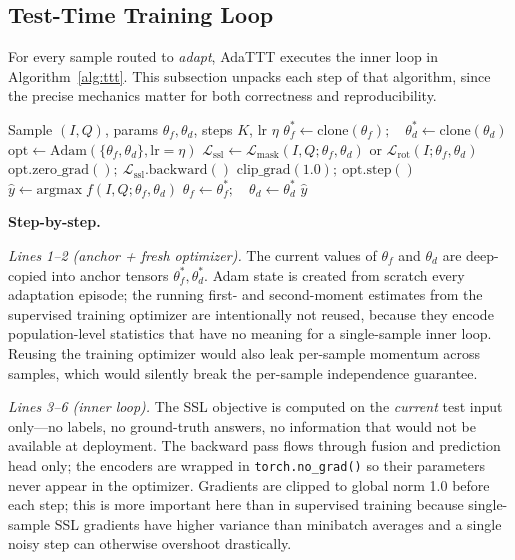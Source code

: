 \documentclass[conference]{IEEEtran}
\begin{document}
\subsection{Test-Time Training Loop}
\label{sec:ttt-loop}

For every sample routed to \emph{adapt}, AdaTTT executes the inner
loop in Algorithm~\ref{alg:ttt}. This subsection unpacks each step of
that algorithm, since the precise mechanics matter for both correctness
and reproducibility.

\begin{algorithm}[!t]
\caption{Per-sample TTT with save-and-restore}
\label{alg:ttt}
\begin{algorithmic}[1]
\REQUIRE Sample $(I,Q)$, params $\theta_f, \theta_d$, steps $K$, lr $\eta$
\STATE $\theta_f^* \leftarrow \mathrm{clone}(\theta_f);\quad \theta_d^* \leftarrow \mathrm{clone}(\theta_d)$
\STATE $\mathrm{opt}\leftarrow \mathrm{Adam}(\{\theta_f,\theta_d\}, \mathrm{lr}{=}\eta)$
   \STATE $\mathcal{L}_{\mathrm{ssl}} \!\leftarrow\! \mathcal{L}_{\mathrm{mask}}(I,Q;\theta_f,\theta_d)$ or $\mathcal{L}_{\mathrm{rot}}(I;\theta_f,\theta_d)$
   \STATE $\mathrm{opt.zero\_grad}();\ \mathcal{L}_{\mathrm{ssl}}.\mathrm{backward}()$
   \STATE $\mathrm{clip\_grad}(1.0);\ \mathrm{opt.step}()$
\ENDFOR
\STATE $\hat{y} \leftarrow \mathrm{argmax}\;f(I,Q;\theta_f,\theta_d)$
\STATE $\theta_f \leftarrow \theta_f^*;\quad \theta_d \leftarrow \theta_d^*$ 
\RETURN $\hat{y}$
\end{algorithmic}
\end{algorithm}

\noindent\textbf{Step-by-step.}

\textit{Lines 1--2 (anchor + fresh optimizer).} The current values of
$\theta_f$ and $\theta_d$ are deep-copied into anchor tensors
$\theta_f^*, \theta_d^*$. Adam state is created from scratch every
adaptation episode; the running first- and second-moment estimates from
the supervised training optimizer are intentionally not reused, because
they encode population-level statistics that have no meaning for a
single-sample inner loop. Reusing the training optimizer would also
leak per-sample momentum across samples, which would silently break the
per-sample independence guarantee.

\textit{Lines 3--6 (inner loop).} The SSL objective is computed on the
\emph{current} test input only---no labels, no ground-truth answers, no
information that would not be available at deployment. The backward pass
flows through fusion and prediction head only; the encoders are wrapped
in \texttt{torch.no\_grad()} so their parameters never appear in the
optimizer. Gradients are clipped to global norm 1.0 before each step;
this is more important here than in supervised training because
single-sample SSL gradients have higher variance than minibatch averages
and a single noisy step can otherwise overshoot drastically.
\end{document}
